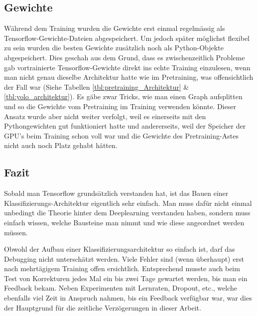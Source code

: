 \subsection{Gewichte}
Während dem Training wurden die Gewichte erst einmal regelmässig als Tensorflow-Gewichte-Dateien abgespeichert.
Um jedoch später möglichst flexibel zu sein wurden die besten Gewichte zusätzlich noch als Python-Objekte abgespeichert.
Dies geschah aus dem Grund, dass es zwischenzeitlich Probleme gab vortrainierte Tensorflow-Gewichte direkt ins echte Training einzulesen, wenn man nicht genau dieselbe Architektur hatte wie im Pretraining, was offensichtlich der Fall war (Siehe Tabellen \ref{tbl:pretraining_Architektur} \& \ref{tbl:yolo_architektur}).
Es gäbe zwar Tricks, wie man einen Graph aufsplitten und so die Gewichte vom Pretraining im Training verwenden könnte. 
Dieser Ansatz wurde aber nicht weiter verfolgt, weil es einerseits mit den Pythongewichten gut funktioniert hatte und andererseits, weil der Speicher der GPU's beim Training schon voll war und die Gewichte des Pretraining-Astes nicht auch noch Platz gehabt hätten.

\subsection{Fazit}
Sobald man Tensorflow grundsätzlich verstanden hat, ist das Bauen einer Klassifizierungs-Architektur eigentlich sehr einfach. 
Man muss dafür nicht einmal unbedingt die Theorie hinter dem Deeplearning verstanden haben, sondern muss einfach wissen, welche Bausteine \grqq{}man\grqq{} nimmt und wie diese angeordnet werden müssen.

Obwohl der Aufbau einer Klassifizierungsarchitektur so einfach ist, darf das Debugging nicht unterschätzt werden.
Viele Fehler sind (wenn überhaupt) erst nach mehrtägigem Training offen ersichtlich.
Entsprechend musste auch beim Test von Korrekturen jedes Mal ein bis zwei Tage gewartet werden, bis man ein Feedback bekam.
Neben Experimenten mit Lernraten, Dropout, etc., welche ebenfalls viel Zeit in Anspruch nahmen, bis ein Feedback verfügbar war, war dies der Hauptgrund für die zeitliche Verzögerungen in dieser Arbeit.